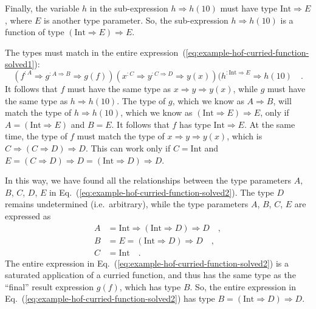 Finally, the variable $h$ in the sub-expression $h\Rightarrow h(10)$
must have type $\text{Int}\Rightarrow E$, where $E$ is another type
parameter. So, the sub-expression $h\Rightarrow h(10)$ is a function
of type $\left(\text{Int}\Rightarrow E\right)\Rightarrow E$.

The types must match in the entire expression~(\ref{eq:example-hof-curried-function-solved1}):
\begin{equation}
(f^{:A}\Rightarrow g^{:A\Rightarrow B}\Rightarrow g(f))(x^{:C}\Rightarrow y^{:C\Rightarrow D}\Rightarrow y(x))(h^{:\text{Int}\Rightarrow E}\Rightarrow h(10)\quad.\label{eq:example-hof-curried-function-solved2}
\end{equation}
It follows that $f$ must have the same type as $x\Rightarrow y\Rightarrow y(x)$,
while $g$ must have the same type as $h\Rightarrow h(10)$. The type
of $g$, which we know as $A\Rightarrow B$, will match the type of
$h\Rightarrow h(10)$, which we know as $\left(\text{Int}\Rightarrow E\right)\Rightarrow E$,
only if $A=\left(\text{Int}\Rightarrow E\right)$ and $B=E$. It follows
that $f$ has type $\text{Int}\Rightarrow E$. At the same time, the
type of $f$ must match the type of $x\Rightarrow y\Rightarrow y(x)$,
which is $C\Rightarrow(C\Rightarrow D)\Rightarrow D$. This can work
only if $C=\text{Int}$ and $E=(C\Rightarrow D)\Rightarrow D=(\text{Int}\Rightarrow D)\Rightarrow D$.

In this way, we have found all the relationships between the type
parameters $A$, $B$, $C$, $D$, $E$ in Eq.~(\ref{eq:example-hof-curried-function-solved2}).
The type $D$ remains undetermined (i.e.~arbitrary), while the type
parameters $A$, $B$, $C$, $E$ are expressed as
\begin{align}
A & =\text{Int}\Rightarrow\left(\text{Int}\Rightarrow D\right)\Rightarrow D\quad,\label{eq:example-hof-curried-solved3}\\
B & =E=\left(\text{Int}\Rightarrow D\right)\Rightarrow D\quad,\label{eq:example-hof-curried-solved4}\\
C & =\text{Int}\quad.\nonumber 
\end{align}
The entire expression in Eq.~(\ref{eq:example-hof-curried-function-solved2})
is a saturated application of a curried function, and thus has the
same type as the ``final'' result expression $g(f)$, which has
type $B$. So, the entire expression in Eq.~(\ref{eq:example-hof-curried-function-solved2})
has type $B=\left(\text{Int}\Rightarrow D\right)\Rightarrow D$.

